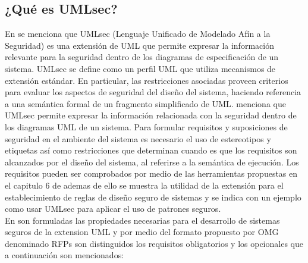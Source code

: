 \documentclass[runningheads,a4paper]{llncs}
\begin{document}
\subsection{¿Qué es \gls{UMLsec}?}
En \cite{UMLsecExtending} se menciona que \gls{UMLsec} (Lenguaje Unificado de Modelado Afín a la Seguridad)  es una extensión de \gls{UML} que permite expresar la información relevante para la seguridad dentro de los diagramas de especificación de un sistema. \gls{UMLsec} se define como un perfil \gls{UML} que utiliza mecanismos de extensión estándar. En particular, las restricciones asociadas proveen criterios para evaluar los aspectos de seguridad del diseño del sistema, haciendo referencia a una semántica formal de un fragmento simplificado de \gls{UML}. \cite{SSDUML} menciona que \gls{UMLsec} permite expresar la información relacionada con la seguridad dentro de los diagramas \gls{UML} de un sistema. Para formular requisitos y suposiciones de seguridad en el ambiente del sistema es necesario el uso de estereotipos y etiquetas así como restricciones que determinan cuando es que los requisitos son alcanzados por el diseño del sistema, al referirse a la semántica de ejecución. Los requisitos pueden ser comprobados por medio de las herramientas propuestas en el capitulo 6 de \cite{SSDUML} ademas de ello se muestra la utilidad de la extensión para el establecimiento de reglas de diseño seguro de sistemas y se indica con un ejemplo como usar \gls{UMLsec} para aplicar el uso de patrones seguros.\\

En \cite{SSDUML} son formuladas las propiedades necesarias para el desarrollo de sistemas seguros de la extension \gls{UML} y por medio del formato propuesto por \gls{OMG} denominado \gls{RFPs} son distinguidos los requisitos obligatorios y los opcionales que a continuación son mencionados:
\end{document}
